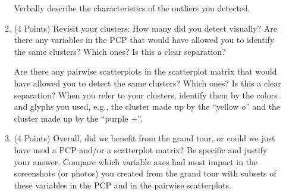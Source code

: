\documentclass[12pt,letterpaper,final]{article}
\begin{document}
\begin{enumerate}
\begin{enumerate}
Verbally describe the characteristics of the outliers you detected. 


\item (4 Points)
Revisit your clusters: How many did you detect visually?
Are there any variables in the PCP that would have allowed you
to identify the same clusters? Which ones? Is this a clear separation?

Are there any pairwise scatterplots in the scatterplot matrix that would have
allowed you to detect the same clusters? Which ones? Is this a clear separation?
When you refer to your clusters, identify them by the colors and glyphs
you used, e.g., the cluster made up by the ``yellow o'' and the cluster 
made up by the ``purple $+$''. 


\item (4 Points)
Overall, did we benefit from the grand tour, or could we just have used
a PCP and/or a scatterplot matrix? Be specific and justify your answer.
Compare which variable axes had most impact in the screenshots (or photos) you created
from the grand tour with subsets of these variables in the PCP and in the
pairwise scatterplots. 


\end{enumerate}


\end{enumerate}


\newpage


~\\
\end{document}
